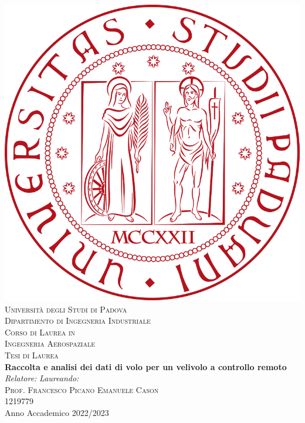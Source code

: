 \documentclass[12pt]{article}
\begin{document}
\begin{titlepage}
  \begin{center}
    \includegraphics[scale=0.1]{img/logo-unipd.png}\\

    \vspace{0.8cm}
    \textsc{\LARGE Universit\`{a} degli Studi di Padova}\\
    \vspace{0.45cm}
    \textsc{\large Dipartimento di Ingegneria Industriale}\\
    \vspace{0.4cm}
    \textsc{\large Corso di Laurea in}\\
    \textsc{\large Ingegneria Aerospaziale}\\
    \vspace{1.2cm}
    \textsc{\large Tesi di Laurea}\\
    \vfill
    { \LARGE \bfseries Raccolta e analisi dei dati di volo per un velivolo a controllo remoto
    }\\
    \vfill
    \textit{\large Relatore:} \hfill \textit{\large Laureando:}\\
    \textsc{\large Prof. Francesco Picano} \hfill \textsc{Emanuele Cason}\\
    \hfill \textsc{1219779}\\

    \vfill
    {\large Anno Accademico 2022/2023}
  \end{center}
\end{titlepage}
\end{document}
